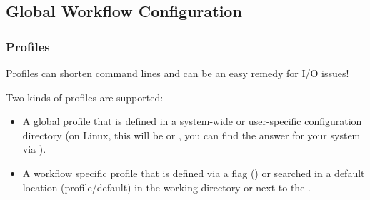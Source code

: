 \subsection{Global Workflow Configuration}

\begin{frame}[fragile]
  \frametitle{\Snakemake{} Profiles}
  \begin{hint}
  	Profiles can shorten command lines and can be an easy remedy for I/O issues!
  \end{hint}
  \pause
  Two kinds of profiles are supported:
  \begin{itemize}[<+->]
  	\item A global profile that is defined in a system-wide or user-specific configuration directory (on Linux, this will be  or , you can find the answer for your system via ).
  	\item A workflow specific profile that is defined via a flag () or searched in a default location (profile/default) in the working directory or next to the .
  \end{itemize}
\end{frame}

